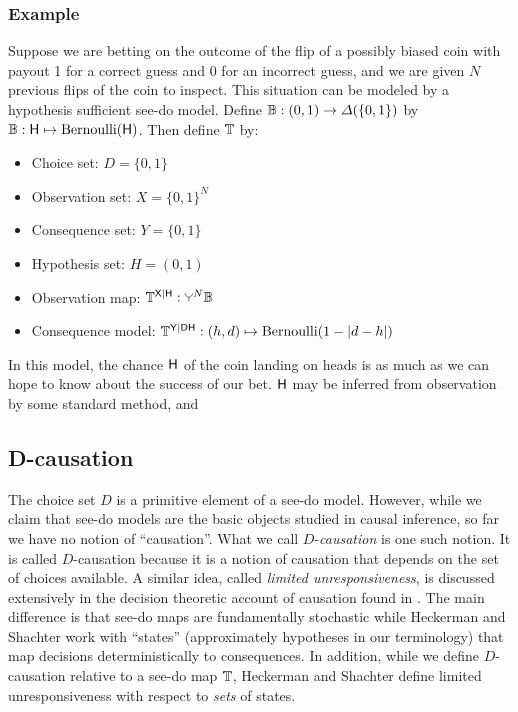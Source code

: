 \subsubsection{Example}

Suppose we are betting on the outcome of the flip of a possibly biased coin with payout 1 for a correct guess and 0 for an incorrect guess, and we are given $N$ previous flips of the coin to inspect. This situation can be modeled by a hypothesis sufficient see-do model. Define $\mathbb{B}:(0,1)\to \Delta(\{0,1\})$ by $\mathbb{B}:\mathsf{H}\mapsto \mathrm{Bernoulli}(\mathsf{H})$. Then define ${\mathbb{T}}$ by:

\begin{itemize}
    \item Choice set: $D=\{0,1\}$
    \item Observation set: $X=\{0,1\}^N$
    \item Consequence set: $Y=\{0,1\}$
    \item Hypothesis set: $H=(0,1)$
    \item Observation map: ${\kernel{T}}^{\RV{X}|\RV{H}}:\splitter{0.1}^N\kernel{B}$
    \item Consequence model: ${\mathbb{T}}^{\mathsf{Y}|\mathsf{D}\mathsf{H}}:(h,d)\mapsto \mathrm{Bernoulli}(1-|d-h|)$
\end{itemize}

In this model, the chance $\mathsf{H}$ of the coin landing on heads is as much as we can hope to know about the success of our bet. $\mathsf{H}$ may be inferred from observation by some standard method, and 

\subsection{D-causation}

The choice set $D$ is a primitive element of a see-do model. However, while we claim that see-do models are the basic objects studied in causal inference, so far we have no notion of ``causation''. What we call $D$-\emph{causation} is one such notion. It is called $D$-causation because it is a notion of causation that depends on the set of choices available. A similar idea, called \emph{limited unresponsiveness}, is discussed extensively in the decision theoretic account of causation found in \citet{heckerman_decision-theoretic_1995}. The main difference is that see-do maps are fundamentally stochastic while Heckerman and Shachter work with ``states'' (approximately hypotheses in our terminology) that map decisions deterministically to consequences. In addition, while we define $D$-causation relative to a see-do map $\mathbb{T}$, Heckerman and Shachter define limited unresponsiveness with respect to \emph{sets} of states.

